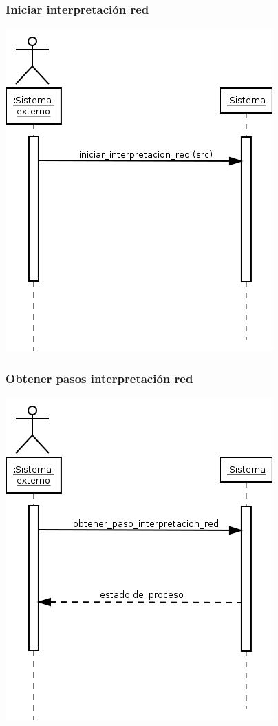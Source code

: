 \subsubsection{Iniciar interpretación red}
\begin{center}
\includegraphics[scale=0.4]{iniciar_interpretacion_red.png} \\
\end{center}

\subsubsection{Obtener pasos interpretación red}
\begin{center}
\includegraphics[scale=0.4]{obtener_paso_interpretacion_red.png} \\
\end{center}


